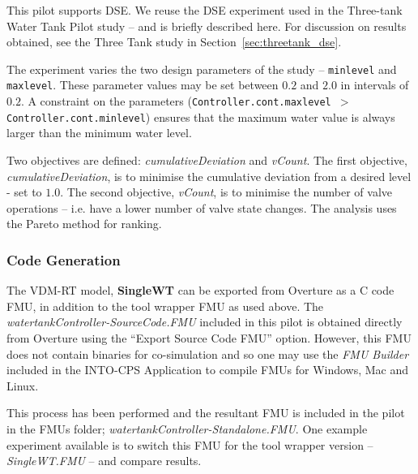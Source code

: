 This pilot supports DSE. We reuse the DSE experiment used in the Three-tank Water Tank Pilot study -- and is briefly described here. For discussion on results obtained, see the Three Tank study in Section~\ref{sec:threetank_dse}.

The experiment varies the two design parameters of the study -- \texttt{minlevel} and \texttt{maxlevel}. These parameter values may be set between $0.2$ and $2.0$ in intervals of $0.2$. A constraint on the parameters (\texttt{{Controller}.cont.maxlevel $>$ {Controller}.cont.minlevel}) ensures that the maximum water value is always larger than the minimum water level. 

Two objectives are defined: \textit{cumulativeDeviation} and \textit{vCount}. The first objective, \textit{cumulativeDeviation}, is to minimise the cumulative deviation from a desired level - set to $1.0$. The second objective, \textit{vCount}, is to minimise the number of valve operations -- i.e. have a lower number of valve state changes. The analysis uses the Pareto method for ranking.

\subsubsection{Code Generation}

The VDM-RT model, \textbf{SingleWT} can be exported from Overture as a C code FMU, in addition to the tool wrapper FMU as used above. The \emph{watertankController-SourceCode.FMU} included in this pilot is obtained directly from Overture using the ``Export Source Code FMU'' option. However, this FMU does not contain binaries for co-simulation and so one may use the \emph{FMU Builder} included in the INTO-CPS Application to compile FMUs for Windows, Mac and Linux. 

This process has been performed and the resultant FMU is included in the pilot in the FMUs folder; \emph{watertankController-Standalone.FMU}. One example experiment available is to switch this FMU for the tool wrapper version -- \emph{SingleWT.FMU} -- and compare results. 